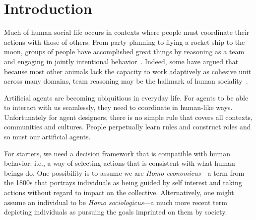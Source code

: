 \section{Introduction}
\label{sec:intro}

Much of human social life occurs in contexts where people must
coordinate their actions with those of others.  From party planning to
flying a rocket ship to the moon, groups of people have accomplished
great things by reasoning as a team and engaging in jointly
intentional behavior~\cite{searle1995construction}.  Indeed, some have
argued that because most other animals lack the capacity to work
adaptively as cohesive unit across many domains, team reasoning may be
the hallmark of human sociality~\cite{tomasello2005understanding}.


Artificial agents are becoming ubiquitious in everyday life. For agents to be
able to interact with us seamlessly, they need to coordinate in human-like ways.
Unfortunately for agent designers,
there is no simple rule that covers all contexts,
communities and cultures. 
People perpetually learn rules and construct roles and
so must our artificial agents.


For starters, we need 
a decision framework that is compatible with 
human behavior: i.e., a way of selecting actions that is consistent with
what human beings do. One possibility is to assume we
are \emph{Homo economicus}---a term from the 1800s that portrays
individuals as being guided by self interest and taking actions 
without regard to impact on the collective.
Alternatively, one might assume an individual to be \emph{Homo
sociologicus}---a much more recent term depicting individuals 
as pursuing the goals imprinted on them by society.

